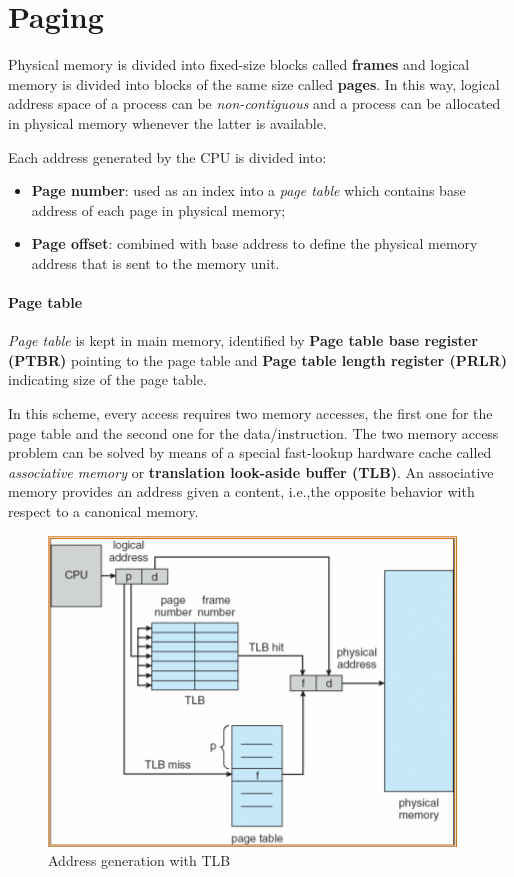 \section{Paging}
Physical memory is divided into fixed-size blocks called \textbf{frames} and logical memory is divided into blocks of the same size called \textbf{pages}. In this way, logical address space of a process can be \emph{non-contiguous} and a process can be allocated in physical memory whenever the latter is available.

Each address generated by the CPU is divided into:
\begin{itemize}
\item \textbf{Page number}: used as an index into a \emph{page table} which contains base address of each page in physical memory;
\item \textbf{Page offset}: combined with base address to define the physical memory address that is sent to the memory unit.
\end{itemize}

\paragraph{Page table} \emph{Page table} is kept in main memory, identified by \textbf{Page table base register (PTBR)} pointing to the page table and \textbf{Page table length register (PRLR)} indicating size of the page table.

In this scheme, every access requires two memory accesses, the first one for the page table and the second one for the data/instruction. The two memory access problem can be solved by means of a special fast-lookup hardware cache called \emph{associative memory} or \textbf{translation look-aside buffer (TLB)}. An associative memory provides an address given a content, i.e.,\@ the opposite behavior with respect to a canonical memory.

\begin{figure}[hbtp]
\centering
\includegraphics[scale=0.6]{images/memory_management/address_generation_tlb.jpg}
\caption{Address generation with TLB}
\end{figure}

